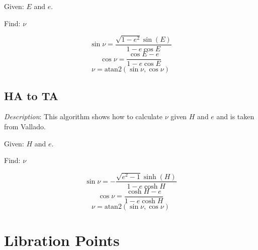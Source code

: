 \noindent Given:  $E$ and $e$.

\noindent Find:  $\nu$

\begin{equation}
   \sin{\nu} = \frac{\sqrt{1 - e^2}\sin(E)}{1-e\cos{E}}
\end{equation}
%
\begin{equation}
   \cos{\nu} = \frac{\cos{E} - e}{ 1 - e\cos{E} }
\end{equation}
%
\begin{equation}
   \nu = \mbox{atan2}(\sin{\nu},\cos{\nu})
\end{equation}

\subsection{HA to TA} \label{Sec:HAtoTA}

\noindent \textit{Description}: This algorithm shows how to
calculate $\nu$ given $H$ and $e$ and is taken from
Vallado\cite{vallado2}.

\noindent Given:  $H$ and $e$.

\noindent Find:  $\nu$

\begin{equation}
   \sin{\nu} = -\frac{\sqrt{e^2 - 1}\sinh(H)}{1-e\cosh{H}}
\end{equation}
%
\begin{equation}
   \cos{\nu} = \frac{\cosh{H} - e}{ 1 - e\cosh{H} }
\end{equation}
%
\begin{equation}
   \nu = \mbox{atan2}(\sin{\nu},\cos{\nu})
\end{equation}

\section{  Libration Points } 


